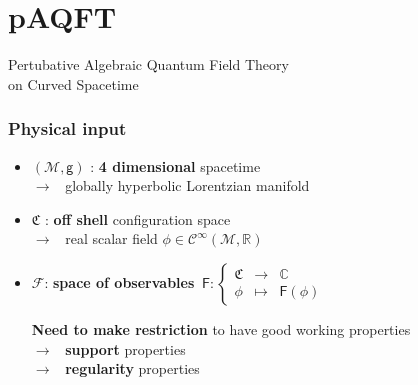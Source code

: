 \documentclass[9pt]{beamer}
\newcommand{\Ccal}{\mathcal{C}}
\newcommand{\Fcal}{\mathcal{F}}
\newcommand{\Mcal}{\mathcal{M}}
\newcommand{\Cbb}{\mathbb{C}}
\newcommand{\Rbb}{\mathbb{R}}
\newcommand{\Crak}{\mathfrak{C}}
\newcommand{\Fsf}{\mathsf{F}}
\newcommand{\gsf}{\mathsf{g}}
\begin{document}
\section{pAQFT}

{%
%
% 
%
%
%
%
\begin{frame}%
\bf
\vspace*{30pt}
%
\begin{exampleblock}{\vspace*{-3ex}}%
%
\begin{center}%
%
\Large Pertubative Algebraic Quantum Field Theory \\[10pt] on Curved Spacetime
%
\end{center}%
%
\end{exampleblock}%
%
\end{frame}
%
}%


\begin{frame}

\frametitle{Physical input}
  
\begin{itemize}
  
\item $(\Mcal,\gsf)$ : \textbf{4 dimensional} spacetime \\[2pt]
\qquad $\to$ \ globally hyperbolic Lorentzian manifold
    
\item $\Crak$ : \textbf{off shell} configuration space \\[2pt] 
\qquad $\to$ \ real scalar field $\phi \in \Ccal^\infty(\Mcal,\Rbb)$
        
\item $\Fcal$: \textbf{space of observables}
$
\ \Fsf : \left\{
\begin{array}{ccc}
\Crak & \to & \Cbb \\
\phi & \mapsto & \Fsf(\phi)
\end{array}
\right.
$
   
\vspace*{16pt}
   
\textbf{Need to make restriction} to have good working properties \\[5pt]

\qquad $\to$ \ \textbf{support} properties \\[3pt]
 
\qquad $\to$ \ \textbf{regularity} properties

\end{itemize}

\end{frame}  
\end{document}

